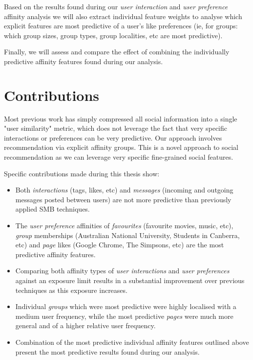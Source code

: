 Based on the results found during our \emph{user interaction} and \emph{user preference} affinity analysis we will also extract individual feature 
weights to analyse which explicit features are most predictive of a user's like preferences 
(ie, for groups: which group sizes, group types, group localities, etc are most predictive).

Finally, we will assess and compare the effect of combining the individually predictive affinity features found during our analysis.

\section{Contributions}
\label{sec:contributions}

Most previous work has simply compressed all social information into a single "user similarity" metric, which does not leverage
the fact that very specific interactions or preferences can be very predictive. Our approach involves  
recommendation via explicit affinity groups. This is a novel approach to social recommendation as we can leverage very specific
fine-grained social features.

Specific contributions made during this thesis show:

\begin{itemize}
\item Both \emph{interactions} (tags, likes, etc) and \emph{messages} (incoming and outgoing messages posted between users) are not more predictive than 
previously applied SMB techniques.
\item The \emph{user preference} affinities of \emph{favourites} (favourite movies, music, etc), \emph{group} memberships (Australian National University, Students in Canberra, etc) 
and \emph{page} likes (Google Chrome, The Simpsons, etc) are the most predictive affinity features.
\item Comparing both affinity types of \emph{user interactions} and \emph{user preferences} against an exposure limit results in a 
substantial improvement over previous techniques as this exposure increases.
\item Individual \emph{groups} which were most predictive were highly localised with a medium user frequency, while the most predictive 
\emph{pages} were much more general and of a higher relative user frequency.
\item Combination of the most predictive individual affinity features outlined above present the most predictive results found during our analysis.
\end{itemize} 

